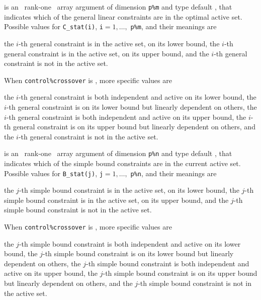 \documentclass{galahad}
\begin{document}
\begin{description}
 is an \optional\ rank-one \intentout\ array argument of
dimension {\tt p\%m}
and type default \integer, that indicates which of the general linear
constraints are in the optimal active set. Possible values for
{\tt C\_stat(i)}, {\tt i}$=1, \ldots ,$ {\tt p\%m}, and their meanings are
\begin{description}
 the $i$-th general constraint
is in the active set, on its lower bound,
 the $i$-th general constraint
is in the active set, on its upper bound, and
  the $i$-th general constraint is not in the active set.
\end{description}
When {\tt control\%crossover} is \true, more specific values are
\begin{description}
 the $i$-th general constraint
is both independent and active on its lower bound,
 the $i$-th general constraint
is on its lower bound but linearly dependent on others,
 the $i$-th general constraint
is both independent and active on its upper bound,
 the $i$-th general constraint
is on its upper bound but linearly dependent on others, and
 the $i$-th general constraint is not in the active set.
\end{description}

 is an \optional\ rank-one \intentout\ array argument of
dimension {\tt p\%n}
and type default \integer, that indicates which of the simple bound
constraints are in the current active set. Possible values for
{\tt B\_stat(j)}, {\tt j}$=1, \ldots ,$ {\tt p\%n}, and their meanings are
\begin{description}
 the $j$-th simple bound constraint
is in the active set, on its lower bound,
 the $j$-th simple bound constraint
is in the active set, on its upper bound, and
  the $j$-th simple bound constraint is not in the active set.
\end{description}
When {\tt control\%crossover} is \true, more specific values are
\begin{description}
 the $j$-th simple bound constraint
is both independent and active on its lower bound,
 the $j$-th simple bound constraint
is on its lower bound but linearly dependent on others,
 the $j$-th simple bound constraint
is both independent and active on its upper bound,
 the $j$-th simple bound constraint
is on its upper bound but linearly dependent on others, and
 the $j$-th simple bound constraint is not in the active set.
\end{description}

\end{description}
\end{document}
